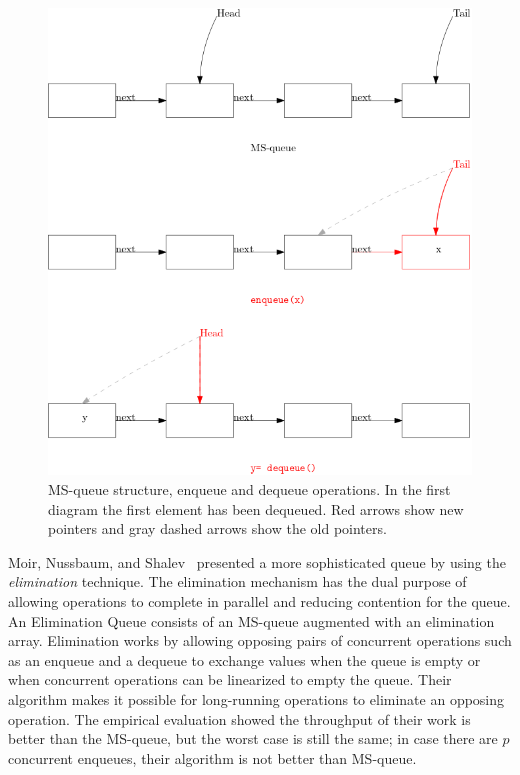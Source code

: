 \documentclass[10pt]{article}
\renewcommand{\it}[1]{\textit{#1}}
\theoremstyle{definition}
\begin{document}
\begin{figure}[hbt]
  \center\includegraphics[scale=0.4]{pics/msqueue}
  \caption{\label{fig::msq}MS-queue structure, enqueue and dequeue operations. In the first diagram the first element has been dequeued. Red arrows show new pointers and gray dashed arrows show the old pointers.}
\end{figure}

Moir, Nussbaum, and Shalev~\cite{DBLP:conf/spaa/MoirNSS05} presented a more sophisticated queue by using the \it{elimination} technique. The elimination mechanism has the dual purpose of allowing operations to complete in parallel and reducing contention for the queue. An Elimination Queue consists of an MS-queue augmented with an elimination array. Elimination works by allowing opposing pairs of concurrent operations such as an enqueue and a dequeue to exchange values when the queue is empty or when concurrent operations can be linearized to empty the queue. Their algorithm makes it possible for long-running operations to eliminate an opposing operation. The empirical evaluation showed the throughput of their work is better than the MS-queue, but the worst case is still the same; in case there are $p$ concurrent enqueues, their algorithm is not better than MS-queue. 
\end{document}
